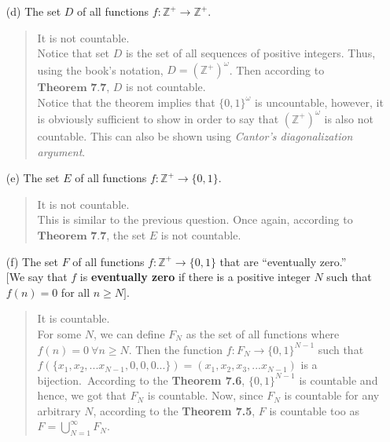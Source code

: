 \documentclass[12pt, a4paper]{article}
\newcommand{\pints}{\mathbb{Z}^+} %
\newcommand{\rarr}{\rightarrow}
\begin{document}
\begin{itemize}
\begin{itemize}
\item[(d)]
The set $D$ of all functions $f : \pints \rarr \pints$.
\begin{quote}
It is not countable.\\
Notice that set $D$ is the set of all sequences of positive integers.
Thus, using the book's notation, $D = (\pints)^{\omega}$.
Then according to $\textbf{Theorem 7.7}$, $D$ is not countable.\\
\smallskip
Notice that the theorem implies that $\{0, 1\}^{\omega}$ is uncountable, however,
it is obviously sufficient to show in order to say that $(\pints)^{\omega}$ is also not countable.
This can also be shown using \textit{Cantor's diagonalization argument}.

\end{quote}

\item[]

\item[(e)]
The set $E$ of all functions $f : \pints \rarr \{0, 1\}$.
\begin{quote}
It is not countable.\\
This is similar to the previous question. Once again, according
to $\textbf{Theorem 7.7}$, the set $E$ is not countable.
\end{quote}

\item[]

\item[(f)]
The set $F$ of all functions $f : \pints \rarr \{0, 1\}$ that are ``eventually zero.''\\
$[$We say that $f$ is \textbf{eventually zero} if there is a positive integer $N$ such that
$f(n) = 0$ for all $n \geq N]$.
\begin{quote}
It is countable.\\
For some $N$, we can define $F_N$ as the set of all functions where $f(n) = 0 \ \forall n \geq N$.
Then the function $f : F_N \rarr \{0, 1\}^{N - 1}$ such that\\
$f(\{x_1, x_2, ... x_{N-1}, 0, 0, 0 ...\}) = (x_1, x_2, x_3, ... x_{N - 1})$
is a bijection.\ According to the \textbf{Theorem 7.6}, $\{0, 1\}^{N - 1}$ is countable and hence, we got that $F_N$ is countable. Now, since $F_N$ is countable for any arbitrary $N$,
according to the \textbf{Theorem 7.5}, $F$ is countable too as $F = \bigcup_{N = 1}^{\infty}F_N$.
\end{quote}

\item[]


\end{itemize}
\end{itemize}
\end{document}
